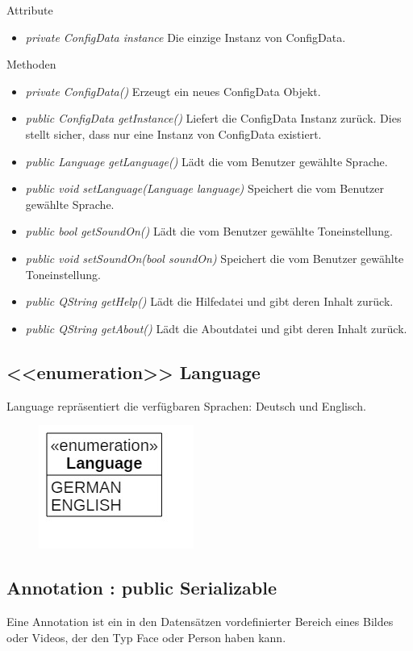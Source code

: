 Attribute
\begin{itemize}
\item\textit{private ConfigData instance} Die einzige Instanz von ConfigData. 
\end{itemize}

Methoden
\begin{itemize}
\item \textit{private ConfigData()} Erzeugt ein neues ConfigData Objekt.
\item \textit{public ConfigData getInstance()} Liefert die ConfigData Instanz zurück. Dies stellt sicher, dass nur eine Instanz von ConfigData existiert.
\item \textit{public Language getLanguage()} Lädt die vom Benutzer gewählte Sprache.
\item \textit{public void setLanguage(Language language)} Speichert die vom Benutzer gewählte Sprache.
\item \textit{public bool getSoundOn()} Lädt die vom Benutzer gewählte Toneinstellung.
\item \textit{public void setSoundOn(bool soundOn)} Speichert die vom Benutzer gewählte Toneinstellung.
\item \textit{public QString getHelp()} Lädt die Hilfedatei und gibt deren Inhalt zurück.
\item \textit{public QString getAbout()} Lädt die Aboutdatei und gibt deren Inhalt zurück.
\end{itemize}

\subsection*{<<enumeration>> Language}
Language repräsentiert die verfügbaren Sprachen: Deutsch und Englisch.

\begin{figure}[H]
\centering
\includegraphics[scale=0.5]{img/Klassendiagramm/Klassen/Language}
\label{fig:language}
\end{figure}

\subsection*{Annotation : public Serializable}
Eine Annotation ist ein in den Datensätzen vordefinierter Bereich eines Bildes oder Videos, der den Typ Face oder Person haben kann.

